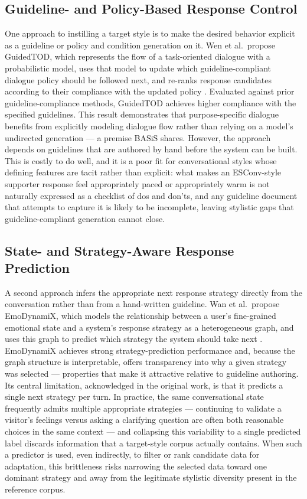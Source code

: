 \documentclass[manuscript,review,anonymous]{acmart}
\begin{document}
\subsection{Guideline- and Policy-Based Response Control}
One approach to instilling a target style is to make the desired behavior explicit as a guideline or policy and condition generation on it. Wen et al.\ propose GuidedTOD, which represents the flow of a task-oriented dialogue with a probabilistic model, uses that model to update which guideline-compliant dialogue policy should be followed next, and re-ranks response candidates according to their compliance with the updated policy \cite{wen2025guidedtod}. Evaluated against prior guideline-compliance methods, GuidedTOD achieves higher compliance with the specified guidelines. This result demonstrates that purpose-specific dialogue benefits from explicitly modeling dialogue flow rather than relying on a model's undirected generation --- a premise BASiS shares. However, the approach depends on guidelines that are authored by hand before the system can be built. This is costly to do well, and it is a poor fit for conversational styles whose defining features are tacit rather than explicit: what makes an ESConv-style supporter response feel appropriately paced or appropriately warm is not naturally expressed as a checklist of dos and don'ts, and any guideline document that attempts to capture it is likely to be incomplete, leaving stylistic gaps that guideline-compliant generation cannot close.

\subsection{State- and Strategy-Aware Response Prediction}
A second approach infers the appropriate next response strategy directly from the conversation rather than from a hand-written guideline. Wan et al.\ propose EmoDynamiX, which models the relationship between a user's fine-grained emotional state and a system's response strategy as a heterogeneous graph, and uses this graph to predict which strategy the system should take next \cite{wan2025emodynamix}. EmoDynamiX achieves strong strategy-prediction performance and, because the graph structure is interpretable, offers transparency into why a given strategy was selected --- properties that make it attractive relative to guideline authoring. Its central limitation, acknowledged in the original work, is that it predicts a single next strategy per turn. In practice, the same conversational state frequently admits multiple appropriate strategies --- continuing to validate a visitor's feelings versus asking a clarifying question are often both reasonable choices in the same context --- and collapsing this variability to a single predicted label discards information that a target-style corpus actually contains. When such a predictor is used, even indirectly, to filter or rank candidate data for adaptation, this brittleness risks narrowing the selected data toward one dominant strategy and away from the legitimate stylistic diversity present in the reference corpus.
\end{document}
